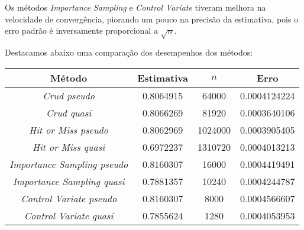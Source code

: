 \documentclass{article}
\begin{document}
Os métodos \textit{Importance Sampling} e \textit{Control Variate} tiveram melhora na velocidade de convergência, piorando um pouco na precisão da estimativa, pois o erro padrão é inversamente proporcional a $\sqrt{n}$.

Destacamos abaixo uma comparação dos desempenhos dos métodos:

\begin{center}
\begin{tabular}{ |c|c|c|c| } 
 \hline
 Método                       & Estimativa & $n$  & Erro \\ 
 \hline
 \textit{Crud pseudo}                & 0.8064915  & 64000  & 0.0004124224 \\ 
 \textit{Crud quasi}                 & 0.8066269  & 81920  & 0.0003640106 \\ 
 \hline
 \textit{Hit or Miss pseudo}         & 0.8062969  & 1024000 & 0.0003905405 \\
 \textit{Hit or Miss quasi}          & 0.6972237  & 1310720 & 0.0004013213 \\
 \hline
 \textit{Importance Sampling pseudo} & 0.8160307  & 16000  & 0.0004419491 \\
 \textit{Importance Sampling quasi}  & 0.7881357  & 10240    &  0.0004244787\\
 \hline
 \textit{Control Variate pseudo}     & 0.8160307  & 8000  & 0.0004566607 \\
  \textit{Control Variate quasi}     & 0.7855624  & 1280 & 0.0004053953 \\
 \hline
\end{tabular}
\end{center}

%
%
\end{document}
